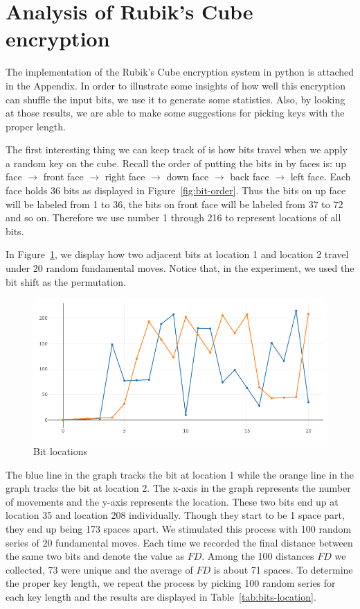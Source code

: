 \section{Analysis of Rubik's Cube encryption}
\par The implementation of the Rubik's Cube encryption system in python is attached in the Appendix. In order to illustrate some insights of how well this encryption can shuffle the input bits, we use it to generate some statistics. Also, by looking at those results, we are able to make some suggestions for picking keys with the proper length.
\par The first interesting thing we can keep track of is how bits travel when we apply a random key on the cube. Recall the order of putting the bits in by faces is: up face $\rightarrow$ front face $\rightarrow$ right face $\rightarrow$ down face $\rightarrow$ back face $\rightarrow$ left face. Each face holds 36 bits as displayed in Figure~\ref{fig:bit-order}. Thus the bits on up face will be labeled from 1 to 36, the bits on front face will be labeled from 37 to 72 and so on. Therefore we use number 1 through 216 to represent locations of all bits.
\par In Figure~\ref{fig:bits-travel}, we display how two adjacent bits at location 1 and location 2 travel under 20 random fundamental moves. Notice that, in the experiment, we used the bit shift as the permutation. 
\begin{figure}[ht]
    \centering
    \includegraphics[width=12cm]{figures/security/bits_travel.png}
    \caption{Bit locations}
    \label{fig:bits-travel}
\end{figure}
The blue line in the graph tracks the bit at location 1 while the orange line in the graph tracks the bit at location 2. The x-axis in the graph represents the number of movements and the y-axis represents the location. These two bits end up at location 35 and location 208 individually. Though they start to be 1 space part, they end up being 173 spaces apart. We stimulated this process with 100 random series of 20 fundamental moves. Each time we recorded the final distance between the same two bits and denote the value as $FD$. Among the 100 distances $FD$ we collected, 73 were unique and the average of $FD$ is about 71 spaces. To determine the proper key length, we repeat the process by picking 100 random series for each key length and the results are displayed in Table~\ref{tab:bits-location}.
